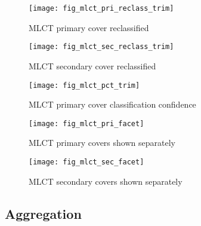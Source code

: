 \begin{figure}[hpt] 
\begin{center}


\texttt{[image: fig\_mlct\_pri\_reclass\_trim]}
\end{center} 
\caption{MLCT primary cover reclassified} 
\label{fig:mlct_pri_reclass} 
\end{figure} 


\begin{figure}[hpt] 
\begin{center}
  

\texttt{[image: fig\_mlct\_sec\_reclass\_trim]}
\end{center} 
\caption{MLCT secondary cover reclassified} 
\label{fig:mlct_sec_reclass} 
\end{figure} 


\begin{figure}[hpt] 
\begin{center}
  

\texttt{[image: fig\_mlct\_pct\_trim]}
\end{center} 
\caption{MLCT primary cover classification confidence} 
\label{fig:mlct_pct} 
\end{figure} 


\begin{figure}[hpt] 
\begin{center}
  

\texttt{[image: fig\_mlct\_pri\_facet]}
\end{center} 
\caption{MLCT primary covers shown separately} 
\label{fig:mlct_pri_facet} 
\end{figure} 


\begin{figure}[hpt] 
\begin{center}
  

\texttt{[image: fig\_mlct\_sec\_facet]}
\end{center} 
\caption{MLCT secondary covers shown separately} 
\label{fig:mlct_sec_facet} 
\end{figure} 


\subsection{Aggregation}
\label{sec:mlct-aggr}

